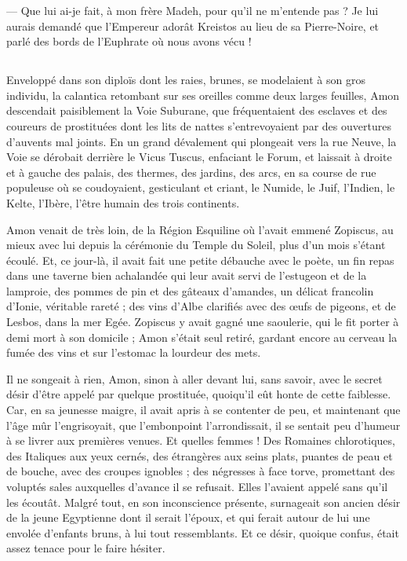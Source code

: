 \documentclass[a4paper, 11pt, oneside, polutonikogreek, french]{article}
\begin{document}
--- Que lui ai-je fait, à mon frère Madeh, pour qu'il ne m'entende pas ? Je lui aurais demandé que l'Empereur adorât Kreistos au lieu de sa Pierre-Noire, et parlé des bords de l'Euphrate où nous avons vécu !
\clearpage
\subsection{}
\paragraph{}
Enveloppé dans son diploïs dont les raies, brunes, se modelaient à son gros individu, la calantica retombant sur ses oreilles comme deux larges feuilles, Amon descendait paisiblement la Voie Suburane, que fréquentaient des esclaves et des coureurs de prostituées dont les lits de nattes s'entrevoyaient par des ouvertures d'auvents mal joints. En un grand dévalement qui plongeait vers la rue Neuve, la Voie se dérobait derrière le Vicus Tuscus, enfaciant le Forum, et laissait à droite et à gauche des palais, des thermes, des jardins, des arcs, en sa course de rue populeuse où se coudoyaient, gesticulant et criant, le Numide, le Juif, l'Indien, le Kelte, l'Ibère, l'être humain des trois continents.

Amon venait de très loin, de la Région Esquiline où l'avait emmené Zopiscus, au mieux avec lui depuis la cérémonie du Temple du Soleil, plus d'un mois s'étant écoulé. Et, ce jour-là, il avait fait une petite débauche avec le poète, un fin repas dans une taverne bien achalandée qui leur avait servi de l'estugeon et de la lamproie, des pommes de pin et des gâteaux d'amandes, un délicat francolin d'Ionie, véritable rareté ; des vins d'Albe clarifiés avec des œufs de pigeons, et de Lesbos, dans la mer Egée. Zopiscus y avait gagné une saoulerie, qui le fit porter à demi mort à son domicile ; Amon s'était seul retiré, gardant encore au cerveau la fumée des vins et sur l'estomac la lourdeur des mets.

Il ne songeait à rien, Amon, sinon à aller devant lui, sans savoir, avec le secret désir d'être appelé par quelque prostituée, quoiqu'il eût honte de cette faiblesse. Car, en sa jeunesse maigre, il avait apris à se contenter de peu, et maintenant que l'âge mûr l'engrisoyait, que l'embonpoint l'arrondissait, il se sentait peu d'humeur à se livrer aux premières venues. Et quelles femmes ! Des Romaines chlorotiques, des Italiques aux yeux cernés, des étrangères aux seins plats, puantes de peau et de bouche, avec des croupes ignobles ; des négresses à face torve, promettant des voluptés sales auxquelles d'avance il se refusait. Elles l'avaient appelé sans qu'il les écoutât. Malgré tout, en son inconscience présente, surnageait son ancien désir de la jeune Egyptienne dont il serait l'époux, et qui ferait autour de lui une envolée d'enfants bruns, à lui tout ressemblants. Et ce désir, quoique confus, était assez tenace pour le faire hésiter.
\end{document}
